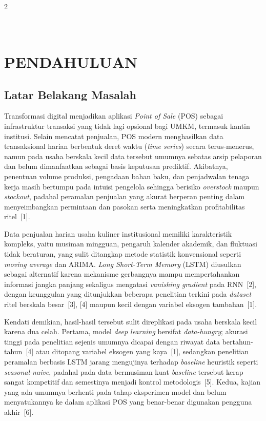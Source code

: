 \documentclass[12pt, a4paper, onecolumn, oneside]{report}
\begin{document}
\begin{spacing}{2}

\chapter[PENDAHULUAN]{\\ PENDAHULUAN}

\section{Latar Belakang Masalah}
Transformasi digital menjadikan aplikasi \textit{Point of Sale} (POS) sebagai infrastruktur transaksi yang tidak lagi opsional bagi UMKM, termasuk kantin institusi. Selain mencatat penjualan, POS modern menghasilkan data transaksional harian berbentuk deret waktu (\textit{time series}) secara terus-menerus, namun pada usaha berskala kecil data tersebut umumnya sebatas arsip pelaporan dan belum dimanfaatkan sebagai basis keputusan prediktif. Akibatnya, penentuan volume produksi, pengadaan bahan baku, dan penjadwalan tenaga kerja masih bertumpu pada intuisi pengelola sehingga berisiko \textit{overstock} maupun \textit{stockout}, padahal peramalan penjualan yang akurat berperan penting dalam menyeimbangkan permintaan dan pasokan serta meningkatkan profitabilitas ritel~[1].

Data penjualan harian usaha kuliner institusional memiliki karakteristik kompleks, yaitu musiman mingguan, pengaruh kalender akademik, dan fluktuasi tidak beraturan, yang sulit ditangkap metode statistik konvensional seperti \textit{moving average} dan ARIMA. \textit{Long Short-Term Memory} (LSTM) diusulkan sebagai alternatif karena mekanisme gerbangnya mampu mempertahankan informasi jangka panjang sekaligus mengatasi \textit{vanishing gradient} pada RNN~[2], dengan keunggulan yang ditunjukkan beberapa penelitian terkini pada \textit{dataset} ritel berskala besar~[3], [4] maupun kecil dengan variabel eksogen tambahan~[1].

Kendati demikian, hasil-hasil tersebut sulit direplikasi pada usaha berskala kecil karena dua celah. Pertama, model \textit{deep learning} bersifat \textit{data-hungry}; akurasi tinggi pada penelitian sejenis umumnya dicapai dengan riwayat data bertahun-tahun~[4] atau ditopang variabel eksogen yang kaya~[1], sedangkan penelitian peramalan berbasis LSTM jarang mengujinya terhadap \textit{baseline} heuristik seperti \textit{seasonal-naive}, padahal pada data bermusiman kuat \textit{baseline} tersebut kerap sangat kompetitif dan semestinya menjadi kontrol metodologis~[5]. Kedua, kajian yang ada umumnya berhenti pada tahap eksperimen model dan belum menyatukannya ke dalam aplikasi POS yang benar-benar digunakan pengguna akhir~[6].


\end{spacing}
\end{document}
